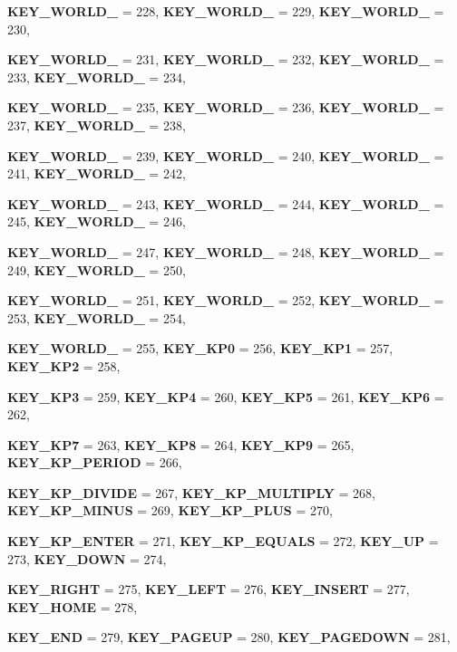 \begin{DoxyCompactItemize}
{\bfseries KEY\_\-WORLD\_} =  228, 
{\bfseries KEY\_\-WORLD\_} =  229, 
{\bfseries KEY\_\-WORLD\_} =  230, 
\par
{\bfseries KEY\_\-WORLD\_} =  231, 
{\bfseries KEY\_\-WORLD\_} =  232, 
{\bfseries KEY\_\-WORLD\_} =  233, 
{\bfseries KEY\_\-WORLD\_} =  234, 
\par
{\bfseries KEY\_\-WORLD\_} =  235, 
{\bfseries KEY\_\-WORLD\_} =  236, 
{\bfseries KEY\_\-WORLD\_} =  237, 
{\bfseries KEY\_\-WORLD\_} =  238, 
\par
{\bfseries KEY\_\-WORLD\_} =  239, 
{\bfseries KEY\_\-WORLD\_} =  240, 
{\bfseries KEY\_\-WORLD\_} =  241, 
{\bfseries KEY\_\-WORLD\_} =  242, 
\par
{\bfseries KEY\_\-WORLD\_} =  243, 
{\bfseries KEY\_\-WORLD\_} =  244, 
{\bfseries KEY\_\-WORLD\_} =  245, 
{\bfseries KEY\_\-WORLD\_} =  246, 
\par
{\bfseries KEY\_\-WORLD\_} =  247, 
{\bfseries KEY\_\-WORLD\_} =  248, 
{\bfseries KEY\_\-WORLD\_} =  249, 
{\bfseries KEY\_\-WORLD\_} =  250, 
\par
{\bfseries KEY\_\-WORLD\_} =  251, 
{\bfseries KEY\_\-WORLD\_} =  252, 
{\bfseries KEY\_\-WORLD\_} =  253, 
{\bfseries KEY\_\-WORLD\_} =  254, 
\par
{\bfseries KEY\_\-WORLD\_} =  255, 
{\bfseries KEY\_\-KP0} =  256, 
{\bfseries KEY\_\-KP1} =  257, 
{\bfseries KEY\_\-KP2} =  258, 
\par
{\bfseries KEY\_\-KP3} =  259, 
{\bfseries KEY\_\-KP4} =  260, 
{\bfseries KEY\_\-KP5} =  261, 
{\bfseries KEY\_\-KP6} =  262, 
\par
{\bfseries KEY\_\-KP7} =  263, 
{\bfseries KEY\_\-KP8} =  264, 
{\bfseries KEY\_\-KP9} =  265, 
{\bfseries KEY\_\-KP\_\-PERIOD} =  266, 
\par
{\bfseries KEY\_\-KP\_\-DIVIDE} =  267, 
{\bfseries KEY\_\-KP\_\-MULTIPLY} =  268, 
{\bfseries KEY\_\-KP\_\-MINUS} =  269, 
{\bfseries KEY\_\-KP\_\-PLUS} =  270, 
\par
{\bfseries KEY\_\-KP\_\-ENTER} =  271, 
{\bfseries KEY\_\-KP\_\-EQUALS} =  272, 
{\bfseries KEY\_\-UP} =  273, 
{\bfseries KEY\_\-DOWN} =  274, 
\par
{\bfseries KEY\_\-RIGHT} =  275, 
{\bfseries KEY\_\-LEFT} =  276, 
{\bfseries KEY\_\-INSERT} =  277, 
{\bfseries KEY\_\-HOME} =  278, 
\par
{\bfseries KEY\_\-END} =  279, 
{\bfseries KEY\_\-PAGEUP} =  280, 
{\bfseries KEY\_\-PAGEDOWN} =  281, 

\end{DoxyCompactItemize}

